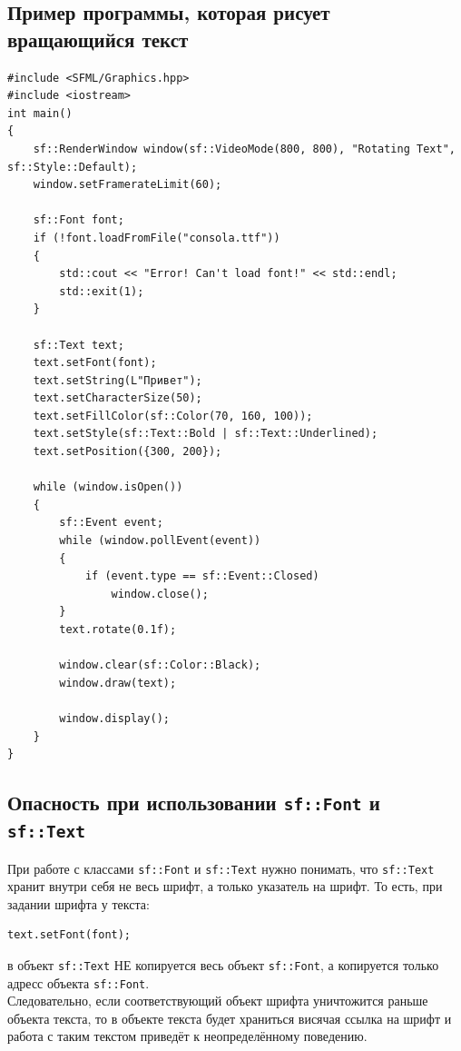 \documentclass{article}
\begin{document}
\subsection*{Пример программы, которая рисует вращающийся текст}
\begin{lstlisting}
#include <SFML/Graphics.hpp>
#include <iostream>
int main()
{
    sf::RenderWindow window(sf::VideoMode(800, 800), "Rotating Text", sf::Style::Default);
    window.setFramerateLimit(60);
    
    sf::Font font;
    if (!font.loadFromFile("consola.ttf")) 
    {
        std::cout << "Error! Can't load font!" << std::endl;
        std::exit(1);
    }

    sf::Text text;
    text.setFont(font);
    text.setString(L"Привет");
    text.setCharacterSize(50);
    text.setFillColor(sf::Color(70, 160, 100));
    text.setStyle(sf::Text::Bold | sf::Text::Underlined);
    text.setPosition({300, 200});

    while (window.isOpen())
    {
        sf::Event event;
        while (window.pollEvent(event)) 
        {
            if (event.type == sf::Event::Closed)
                window.close();
        }
        text.rotate(0.1f);

        window.clear(sf::Color::Black);
        window.draw(text);

        window.display();
    }
}
\end{lstlisting}

\newpage
\subsection*{Опасность при использовании \texttt{sf::Font} и \texttt{sf::Text}}
При работе с классами \texttt{sf::Font} и \texttt{sf::Text} нужно понимать, что \texttt{sf::Text} хранит внутри себя не весь шрифт, а только указатель на шрифт. То есть, при задании шрифта у текста:
\begin{lstlisting}[frame=none]
text.setFont(font);
\end{lstlisting}
в объект \texttt{sf::Text} НЕ копируется весь объект \texttt{sf::Font}, а копируется только адресс объекта \texttt{sf::Font}.\\
Следовательно, если соответствующий объект шрифта уничтожится раньше объекта текста, то в объекте текста будет храниться висячая ссылка на шрифт и работа с таким текстом приведёт к неопределённому поведению.
\end{document}
